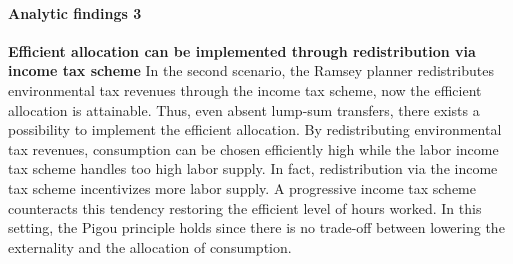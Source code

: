 \paragraph{Analytic findings 3}
\textbf{Efficient allocation can be implemented through redistribution via income tax scheme}
In the second scenario, the Ramsey planner redistributes environmental tax revenues through the income tax scheme, now the efficient allocation is attainable. Thus, even absent lump-sum transfers, there exists a possibility to implement the efficient allocation. By redistributing environmental tax revenues, consumption can be chosen efficiently high while the labor income tax scheme handles too high labor supply. In fact, redistribution via the income tax scheme incentivizes more labor supply. A progressive income tax scheme counteracts this tendency restoring the efficient level of hours worked. 
In this setting, the Pigou principle holds since there is no trade-off between lowering the externality and the allocation of consumption.
% 
% 
% 


